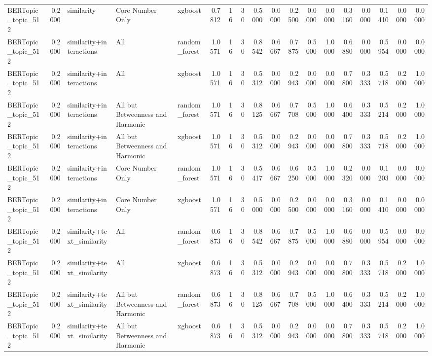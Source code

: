 \begin{tabular}{lrlllrrrrrrrrrrrrr}
BERTopic_topic_512 & 0.2000 & similarity & Core Number Only & xgboost & 0.7812 & 16 & 30 & 0.5000 & 0.0000 & 0.2500 & 0.0000 & 0.0000 & 0.3160 & 0.0000 & 0.1410 & 0.0000 & 0.0000 \\
BERTopic_topic_512 & 0.2000 & similarity+interactions & All & random_forest & 1.0571 & 16 & 30 & 0.8542 & 0.6667 & 0.7875 & 0.5000 & 1.0000 & 0.6880 & 0.0000 & 0.5954 & 0.0000 & 0.0000 \\
BERTopic_topic_512 & 0.2000 & similarity+interactions & All & xgboost & 1.0571 & 16 & 30 & 0.5312 & 0.0000 & 0.2943 & 0.0000 & 0.0000 & 0.7800 & 0.3333 & 0.5718 & 0.2000 & 1.0000 \\
BERTopic_topic_512 & 0.2000 & similarity+interactions & All but Betweenness and Harmonic & random_forest & 1.0571 & 16 & 30 & 0.8125 & 0.6667 & 0.7708 & 0.5000 & 1.0000 & 0.6400 & 0.3333 & 0.5214 & 0.2000 & 1.0000 \\
BERTopic_topic_512 & 0.2000 & similarity+interactions & All but Betweenness and Harmonic & xgboost & 1.0571 & 16 & 30 & 0.5312 & 0.0000 & 0.2943 & 0.0000 & 0.0000 & 0.7800 & 0.3333 & 0.5718 & 0.2000 & 1.0000 \\
BERTopic_topic_512 & 0.2000 & similarity+interactions & Core Number Only & random_forest & 1.0571 & 16 & 30 & 0.5417 & 0.6667 & 0.6250 & 0.5000 & 1.0000 & 0.2320 & 0.0000 & 0.1203 & 0.0000 & 0.0000 \\
BERTopic_topic_512 & 0.2000 & similarity+interactions & Core Number Only & xgboost & 1.0571 & 16 & 30 & 0.5000 & 0.0000 & 0.2500 & 0.0000 & 0.0000 & 0.3160 & 0.0000 & 0.1410 & 0.0000 & 0.0000 \\
BERTopic_topic_512 & 0.2000 & similarity+text_similarity & All & random_forest & 0.6873 & 16 & 30 & 0.8542 & 0.6667 & 0.7875 & 0.5000 & 1.0000 & 0.6880 & 0.0000 & 0.5954 & 0.0000 & 0.0000 \\
BERTopic_topic_512 & 0.2000 & similarity+text_similarity & All & xgboost & 0.6873 & 16 & 30 & 0.5312 & 0.0000 & 0.2943 & 0.0000 & 0.0000 & 0.7800 & 0.3333 & 0.5718 & 0.2000 & 1.0000 \\
BERTopic_topic_512 & 0.2000 & similarity+text_similarity & All but Betweenness and Harmonic & random_forest & 0.6873 & 16 & 30 & 0.8125 & 0.6667 & 0.7708 & 0.5000 & 1.0000 & 0.6400 & 0.3333 & 0.5214 & 0.2000 & 1.0000 \\
BERTopic_topic_512 & 0.2000 & similarity+text_similarity & All but Betweenness and Harmonic & xgboost & 0.6873 & 16 & 30 & 0.5312 & 0.0000 & 0.2943 & 0.0000 & 0.0000 & 0.7800 & 0.3333 & 0.5718 & 0.2000 & 1.0000 \\

\end{tabular}

